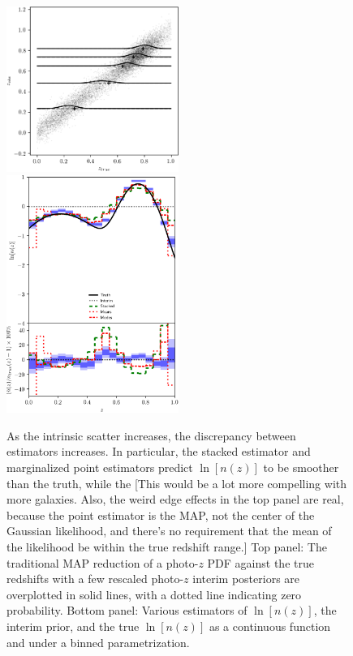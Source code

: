 \documentclass[iop]{emulateapj}
\begin{document}
\begin{figure}
	\begin{center}
		\includegraphics[width=0.5\textwidth]{fig/high_scatter/scatter.png}\\
		\includegraphics[width=0.5\textwidth]{fig/high_scatter/estimators.png}		
		\caption{As the intrinsic scatter increases, the discrepancy between estimators increases.  In particular, the stacked estimator and marginalized point estimators predict $\ln[n(z)]$ to be smoother than the truth, while the  [This would be a lot more compelling with more galaxies.  Also, the weird edge effects in the top panel are real, because the point estimator is the MAP, not the center of the Gaussian likelihood, and there's no requirement that the mean of the likelihood be within the true redshift range.]  Top panel: The traditional MAP reduction of a photo-$z$ PDF against the true redshifts with a few rescaled photo-$z$ interim posteriors are overplotted in solid lines, with a dotted line indicating zero probability.  Bottom panel: Various estimators of $\ln[n(z)]$, the interim prior, and the true $\ln[n(z)]$ as a continuous function and under a binned parametrization.}
		\label{fig:intscat}
	\end{center}
\end{figure}
\end{document}
